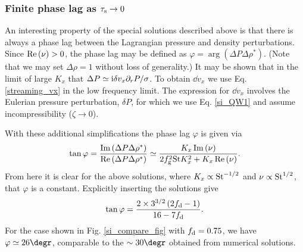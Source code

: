 \subsubsection{Finite phase lag as $\tau_\mathrm{s}\to 0$}  
An interesting property of the special solutions described above is
that there is always a phase lag between the Lagrangian pressure and
density perturbations. Since $\operatorname{Re}{(\nu)}>0$, the phase lag may be
defined as $\varphi = \arg{\left(\Delta P \Delta \rho^*\right)}$. %
(Note that we may set $\Delta\rho = 1$ without loss of generality.) 
It may be shown that in the limit of large $K_x$  that $\Delta P
\simeq \mathrm{i} \delta v_x \partial_rP/\sigma$. To obtain $\dd v_x$ we use
Eq. \ref{streaming_vx} in the low frequency limit. The expression for $\dd v_x$ involves
the Eulerian pressure perturbation, $\delta P$, for which we use 
Eq. \ref{si_QW1} and assume incompressibility ($\zeta\to0$).  

With these additional simplifications the phase lag $\varphi$ is given
via  
\begin{align}
  \tan{\varphi} = \frac{\operatorname{Im}{\left(\Delta
        P\Delta\rho^*\right)}}{\operatorname{Re}{\left(\Delta
        P\Delta\rho^*\right)}}\simeq\frac{K_x\operatorname{Im}{(\nu)}}{2f_\mathrm{g}^2\mathrm{St}
      K_x^2 + K_x \operatorname{Re}{(\nu)}}. 
\end{align}
From here it is clear for the above solutions, where
$K_x\propto \mathrm{St}^{-1/2}$ and $\nu \propto \mathrm{St}^{1/2}$, that $\varphi$ is
a constant. Explicitly inserting the solutions give 
\begin{align}
\tan{\varphi} = \frac{2\times 3^{3/2}\left(2f_\mathrm{d}-1\right)}{16 -
  7f_\mathrm{d}}. 
\end{align}
For the case shown in Fig. \ref{si_compare_fig} with $f_\mathrm{d}=0.75$, we
have $\varphi\simeq 26\degr$, comparable to the $\sim 30\degr$
obtained from numerical solutions. 

